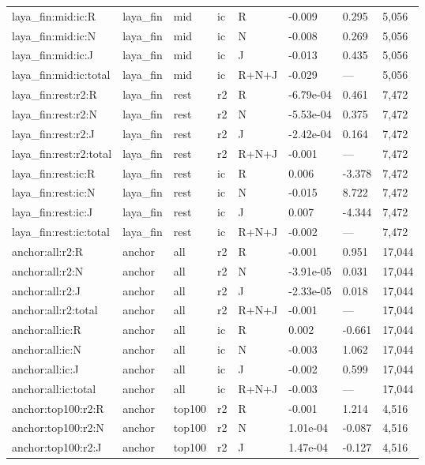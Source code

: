 \begin{tabular}{llllllll}
laya\_fin:mid:ic:R & laya\_fin & mid & ic & R & -0.009 & 0.295 & 5,056 \\
laya\_fin:mid:ic:N & laya\_fin & mid & ic & N & -0.008 & 0.269 & 5,056 \\
laya\_fin:mid:ic:J & laya\_fin & mid & ic & J & -0.013 & 0.435 & 5,056 \\
laya\_fin:mid:ic:total & laya\_fin & mid & ic & R+N+J & -0.029 & — & 5,056 \\
laya\_fin:rest:r2:R & laya\_fin & rest & r2 & R & -6.79e-04 & 0.461 & 7,472 \\
laya\_fin:rest:r2:N & laya\_fin & rest & r2 & N & -5.53e-04 & 0.375 & 7,472 \\
laya\_fin:rest:r2:J & laya\_fin & rest & r2 & J & -2.42e-04 & 0.164 & 7,472 \\
laya\_fin:rest:r2:total & laya\_fin & rest & r2 & R+N+J & -0.001 & — & 7,472 \\
laya\_fin:rest:ic:R & laya\_fin & rest & ic & R & 0.006 & -3.378 & 7,472 \\
laya\_fin:rest:ic:N & laya\_fin & rest & ic & N & -0.015 & 8.722 & 7,472 \\
laya\_fin:rest:ic:J & laya\_fin & rest & ic & J & 0.007 & -4.344 & 7,472 \\
laya\_fin:rest:ic:total & laya\_fin & rest & ic & R+N+J & -0.002 & — & 7,472 \\
anchor:all:r2:R & anchor & all & r2 & R & -0.001 & 0.951 & 17,044 \\
anchor:all:r2:N & anchor & all & r2 & N & -3.91e-05 & 0.031 & 17,044 \\
anchor:all:r2:J & anchor & all & r2 & J & -2.33e-05 & 0.018 & 17,044 \\
anchor:all:r2:total & anchor & all & r2 & R+N+J & -0.001 & — & 17,044 \\
anchor:all:ic:R & anchor & all & ic & R & 0.002 & -0.661 & 17,044 \\
anchor:all:ic:N & anchor & all & ic & N & -0.003 & 1.062 & 17,044 \\
anchor:all:ic:J & anchor & all & ic & J & -0.002 & 0.599 & 17,044 \\
anchor:all:ic:total & anchor & all & ic & R+N+J & -0.003 & — & 17,044 \\
anchor:top100:r2:R & anchor & top100 & r2 & R & -0.001 & 1.214 & 4,516 \\
anchor:top100:r2:N & anchor & top100 & r2 & N & 1.01e-04 & -0.087 & 4,516 \\
anchor:top100:r2:J & anchor & top100 & r2 & J & 1.47e-04 & -0.127 & 4,516 \\

\end{tabular}
